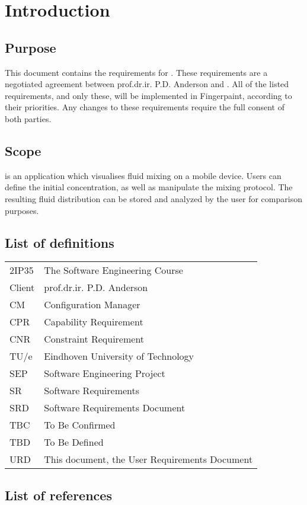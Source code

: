 \chapter{Introduction}

\section{Purpose}
This document contains the requirements for \projectname. These requirements are a negotiated agreement between prof.dr.ir. P.D. Anderson and \projectauthor. All of the listed requirements, and only these, will be implemented in Fingerpaint, according to their priorities. Any changes to these requirements require the full consent of both parties.

\section{Scope}
\projectname is an application which visualises fluid mixing on a mobile device. Users can define the initial concentration, as well as manipulate the mixing protocol. The resulting fluid distribution can be stored and analyzed by the user for comparison purposes.

\section{List of definitions}
\begin{tabular}{l|l}
2IP35 & The Software Engineering Course \\
Client & prof.dr.ir. P.D. Anderson \\
CM    &Configuration Manager \\
CPR & Capability Requirement \\
CNR & Constraint Requirement \\
TU/e  &Eindhoven University of Technology \\
SEP   &Software Engineering Project \\
SR    &Software Requirements \\
SRD   &Software Requirements Document \\
TBC & To Be Confirmed \\
TBD & To Be Defined \\
URD & This document, the User Requirements Document \\
\end{tabular}

\section{List of references}

